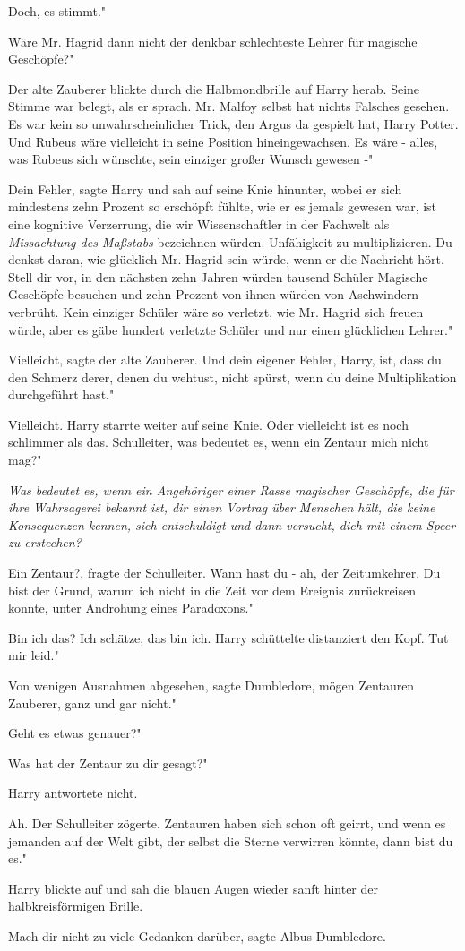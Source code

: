 \glqq Doch, es stimmt."

\glqq Wäre Mr. Hagrid dann nicht der denkbar schlechteste Lehrer für magische
Geschöpfe?"

Der alte Zauberer blickte durch die Halbmondbrille auf Harry herab. Seine Stimme
war belegt, als er sprach. \glqq Mr. Malfoy selbst hat nichts Falsches gesehen.
Es war kein so unwahrscheinlicher Trick, den Argus da gespielt hat, Harry
Potter. Und Rubeus wäre vielleicht in seine Position hineingewachsen. Es wäre -
alles, was Rubeus sich wünschte, sein einziger großer Wunsch gewesen -"

\glqq Dein Fehler\grqq{}, sagte Harry und sah auf seine Knie hinunter, wobei er
sich mindestens zehn Prozent so erschöpft fühlte, wie er es jemals gewesen war,
\glqq ist eine kognitive Verzerrung, die wir Wissenschaftler in der Fachwelt als
\emph{Missachtung des Maßstabs} bezeichnen würden. Unfähigkeit zu
multiplizieren. Du denkst daran, wie glücklich Mr. Hagrid sein würde, wenn er
die Nachricht hört. Stell dir vor, in den nächsten zehn Jahren würden tausend
Schüler Magische Geschöpfe besuchen und zehn Prozent von ihnen würden von
Aschwindern verbrüht. Kein einziger Schüler wäre so verletzt, wie Mr. Hagrid
sich freuen würde, aber es gäbe hundert verletzte Schüler und nur einen
glücklichen Lehrer."

\glqq Vielleicht\grqq{}, sagte der alte Zauberer. \glqq Und dein eigener Fehler,
Harry, ist, dass du den Schmerz derer, denen du wehtust, nicht spürst, wenn du
deine Multiplikation durchgeführt hast."

\glqq Vielleicht.\grqq{} Harry starrte weiter auf seine Knie. \glqq Oder
vielleicht ist es noch schlimmer als das. Schulleiter, was bedeutet es, wenn ein
Zentaur mich nicht mag?"

\emph{Was bedeutet es, wenn ein Angehöriger einer Rasse magischer Geschöpfe, die für ihre Wahrsagerei bekannt ist, dir einen Vortrag über Menschen hält, die keine Konsequenzen kennen, sich entschuldigt und dann versucht, dich mit einem Speer zu erstechen?}

\glqq Ein Zentaur?\grqq{}, fragte der Schulleiter. \glqq Wann hast du - ah, der
Zeitumkehrer. Du bist der Grund, warum ich nicht in die Zeit vor dem Ereignis
zurückreisen konnte, unter Androhung eines Paradoxons."

\glqq Bin ich das? Ich schätze, das bin ich.\grqq{} Harry schüttelte distanziert
den Kopf. \glqq Tut mir leid."

\glqq Von wenigen Ausnahmen abgesehen\grqq{}, sagte Dumbledore, \glqq mögen
Zentauren Zauberer, ganz und gar nicht."

\glqq Geht es etwas genauer?"

\glqq Was hat der Zentaur zu dir gesagt?"

Harry antwortete nicht.

\glqq Ah.\grqq{} Der Schulleiter zögerte. \glqq Zentauren haben sich schon oft
geirrt, und wenn es jemanden auf der Welt gibt, der selbst die Sterne verwirren
könnte, dann bist du es."

Harry blickte auf und sah die blauen Augen wieder sanft hinter der
halbkreisförmigen Brille.

\glqq Mach dir nicht zu viele Gedanken darüber\grqq{}, sagte Albus Dumbledore.


